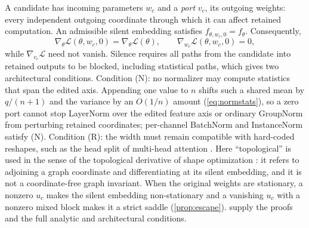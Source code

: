 \documentclass[10pt]{article}
\theoremstyle{paper}
\newcommand{\Lcal}{\mathcal L}
\begin{document}
A candidate has incoming parameters $w_c$ and a \emph{port} $v_c$, its outgoing weights: every independent outgoing coordinate through which it can affect retained computation. An admissible silent embedding satisfies $f_{\theta,w_c,0}=f_\theta$. Consequently,
\begin{equation}
\nabla_\theta\Lcal(\theta,w_c,0)=\nabla_\theta\Lcal(\theta),
\qquad \nabla_{w_c}\Lcal(\theta,w_c,0)=0,
\label{eq:main-embedding}
\end{equation}
while $\nabla_{v_c}\Lcal$ need not vanish. Silence requires all paths from the candidate into retained outputs to be blocked, including statistical paths, which gives two architectural conditions. Condition (N): no normalizer may compute statistics that span the edited axis. Appending one value to $n$ shifts such a shared mean by $q/(n+1)$ and the variance by an $O(1/n)$ amount (\cref{eq:normstats}), so a zero port cannot stop LayerNorm \citep{ba2016layer} over the edited feature axis or ordinary GroupNorm \citep{wu2018group} from perturbing retained coordinates; per-channel BatchNorm and InstanceNorm \citep{ioffe2015batch,ulyanov2016instance} satisfy (N). Condition (R): the width must remain compatible with hard-coded reshapes, such as the head split of multi-head attention \citep{vaswani2017attention}. Here ``topological'' is used in the sense of the topological derivative of shape optimization \citep{sokolowski1999topological,novotny2012topological}: it refers to adjoining a graph coordinate and differentiating at its silent embedding, and it is not a coordinate-free graph invariant. When the original weights are stationary, a nonzero $u_c$ makes the silent embedding non-stationary and a vanishing $u_c$ with a nonzero mixed block makes it a strict saddle \citep{ge2015escaping} (\cref{prop:escape}).  supply the proofs and the full analytic and architectural conditions.
\end{document}
